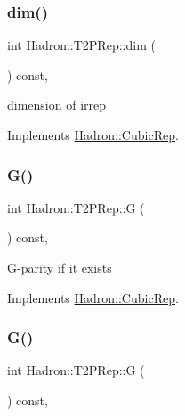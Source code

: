 \subsubsection{\texorpdfstring{dim()}{dim()}\hspace{0.1cm}{\footnotesize\ttfamily [3/3]}}
{\footnotesize\ttfamily int Hadron\+::\+T2\+P\+Rep\+::dim (\begin{DoxyParamCaption}{ }\end{DoxyParamCaption}) const\hspace{0.3cm}{\ttfamily [inline]}, {\ttfamily [virtual]}}

dimension of irrep 

Implements \mbox{\hyperlink{structHadron_1_1CubicRep_ac178d14064f037a66af4b9fb4b312d51}{Hadron\+::\+Cubic\+Rep}}.

\mbox{\label{structHadron_1_1T2PRep_a6631723323b6b83a42b23f1c93ee60f9}} 
\subsubsection{\texorpdfstring{G()}{G()}\hspace{0.1cm}{\footnotesize\ttfamily [1/3]}}
{\footnotesize\ttfamily int Hadron\+::\+T2\+P\+Rep\+::G (\begin{DoxyParamCaption}{ }\end{DoxyParamCaption}) const\hspace{0.3cm}{\ttfamily [inline]}, {\ttfamily [virtual]}}

G-\/parity if it exists 

Implements \mbox{\hyperlink{structHadron_1_1CubicRep_a52104e43266d1614c00bbd1c3b395458}{Hadron\+::\+Cubic\+Rep}}.

\mbox{\label{structHadron_1_1T2PRep_a6631723323b6b83a42b23f1c93ee60f9}} 
\subsubsection{\texorpdfstring{G()}{G()}\hspace{0.1cm}{\footnotesize\ttfamily [2/3]}}
{\footnotesize\ttfamily int Hadron\+::\+T2\+P\+Rep\+::G (\begin{DoxyParamCaption}{ }\end{DoxyParamCaption}) const\hspace{0.3cm}{\ttfamily [inline]}, {\ttfamily [virtual]}}

